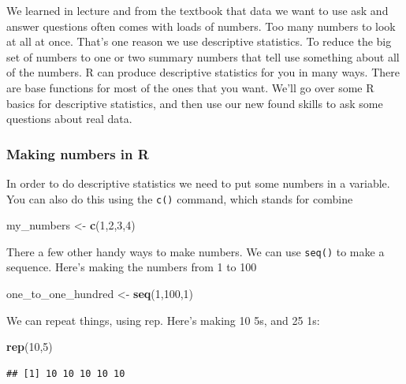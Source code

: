 \documentclass[]{book}
\newenvironment{Shaded}{\begin{snugshade}}{\end{snugshade}}
\newcommand{\KeywordTok}[1]{\textcolor[rgb]{0.13,0.29,0.53}{\textbf{#1}}}
\newcommand{\DecValTok}[1]{\textcolor[rgb]{0.00,0.00,0.81}{#1}}
\newcommand{\StringTok}[1]{\textcolor[rgb]{0.31,0.60,0.02}{#1}}
\newcommand{\NormalTok}[1]{#1}
\begin{document}
We learned in lecture and from the textbook that data we want to use ask
and answer questions often comes with loads of numbers. Too many numbers
to look at all at once. That's one reason we use descriptive statistics.
To reduce the big set of numbers to one or two summary numbers that tell
use something about all of the numbers. R can produce descriptive
statistics for you in many ways. There are base functions for most of
the ones that you want. We'll go over some R basics for descriptive
statistics, and then use our new found skills to ask some questions
about real data.

\subsubsection{Making numbers in R}\label{making-numbers-in-r}

In order to do descriptive statistics we need to put some numbers in a
variable. You can also do this using the \texttt{c()} command, which
stands for combine

\begin{Shaded}
\begin{Highlighting}[]
\NormalTok{my_numbers <-}\StringTok{ }\KeywordTok{c}\NormalTok{(}\DecValTok{1}\NormalTok{,}\DecValTok{2}\NormalTok{,}\DecValTok{3}\NormalTok{,}\DecValTok{4}\NormalTok{)}
\end{Highlighting}
\end{Shaded}

There a few other handy ways to make numbers. We can use \texttt{seq()}
to make a sequence. Here's making the numbers from 1 to 100

\begin{Shaded}
\begin{Highlighting}[]
\NormalTok{one_to_one_hundred <-}\StringTok{ }\KeywordTok{seq}\NormalTok{(}\DecValTok{1}\NormalTok{,}\DecValTok{100}\NormalTok{,}\DecValTok{1}\NormalTok{)}
\end{Highlighting}
\end{Shaded}

We can repeat things, using rep. Here's making 10 5s, and 25 1s:

\begin{Shaded}
\begin{Highlighting}[]
\KeywordTok{rep}\NormalTok{(}\DecValTok{10}\NormalTok{,}\DecValTok{5}\NormalTok{)}
\end{Highlighting}
\end{Shaded}

\begin{verbatim}
## [1] 10 10 10 10 10
\end{verbatim}
\end{document}
